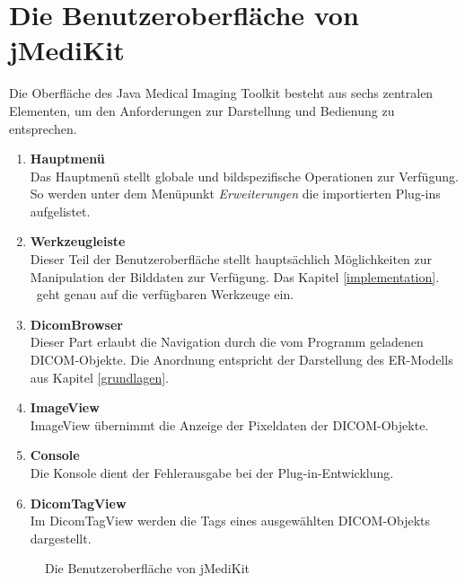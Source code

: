 \FloatBarrier
\section{Die Benutzeroberfläche von jMediKit} \label{jmedikit_structure}

Die Oberfläche des Java Medical Imaging Toolkit besteht aus sechs zentralen Elementen, um den Anforderungen zur Darstellung und Bedienung zu entsprechen.

\pagebreak

\begin{enumerate}
\item \textbf{Hauptmenü} \\
	  Das Hauptmenü stellt globale und bildspezifische Operationen zur Verfügung. So werden unter dem Menüpunkt \textit{Erweiterungen} die importierten Plug-ins aufgelistet.
\item \textbf{Werkzeugleiste} \\
	  Dieser Teil der Benutzeroberfläche stellt hauptsächlich Möglichkeiten zur Manipulation der Bilddaten zur Verfügung. Das Kapitel \glqq \ref{implementation}. \grqq\ geht genau auf die verfügbaren Werkzeuge ein.
\item \textbf{DicomBrowser} \\
	  Dieser Part erlaubt die Navigation durch die vom Programm geladenen DICOM-Objekte. Die Anordnung entspricht der Darstellung des ER-Modells aus Kapitel \glqq \ref{grundlagen}. \grqq\
\item \textbf{ImageView} \\
	 ImageView übernimmt die Anzeige der Pixeldaten der DICOM-Objekte.
\item \textbf{Console} \\
	Die Konsole dient der Fehlerausgabe bei der Plug-in-Entwicklung.
\item \textbf{DicomTagView} \\
	Im DicomTagView werden die Tags eines ausgewählten DICOM-Objekts dargestellt.
\end{enumerate}

\begin{figure}[htbp]
  \vspace{0.5cm}
  \centering
  \caption{Die Benutzeroberfläche von jMediKit}
  \label{jmedikitui}
  \vspace{0.5cm}
\end{figure}

